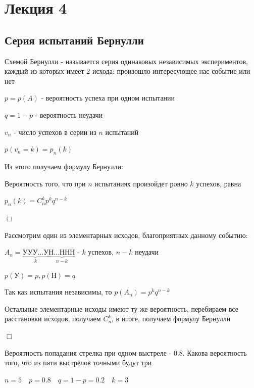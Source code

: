 \documentclass[12pt]{article}
\begin{document}

    \section{Лекция 4}

    \subsection{Серия испытаний Бернулли}

    Схемой Бернулли - называется серия одинаковых независимых экспериментов, каждый из которых имеет 2 исхода: произошло интересующее нас событие или нет

    $p = p(A)$ - вероятность успеха при одном испытании

    $q = 1 - p$ - вероятность неудачи

    $v_n$ - число успехов в серии из $n$ испытаний

    $p(v_n = k) = p_n(k)$

    Из этого получаем формулу Бернулли:

    \begin{MyTheorem}
        \Ths Вероятность того, что при $n$ испытаниях произойдет ровно $k$ успехов, равна

        $p_n(k) = C_n^k p^k q^{n - k}$
    \end{MyTheorem}

    \begin{MyProof}
        $\Box$

        Рассмотрим один из элементарных исходов, благоприятных данному событию:

        $A_n = \underset{k}{\underbrace{\text{УУУ}\dots\text{У}}}\underset{n - k}{\underbrace{\text{Н}\dots\text{ННН}}}$ - $k$ успехов, $n - k$ неудачи

        $p(\text{У}) = p, p(\text{Н}) = q$

        Так как испытания независимы, то $p(A_n) = p^k q^{n - k}$

        Остальные элементарные исходы имеют ту же вероятность, перебираем все расстановки исходов, получаем $C_n^k$, в итоге, получаем формулу Бернулли

        $\Box$
    \end{MyProof}

    \Ex Вероятность попадания стрелка при одном выстреле - $0.8$. Какова вероятность того, что из пяти выстрелов точными будут три

    $n = 5 \quad p = 0.8 \quad q = 1 - p = 0.2 \quad k = 3$
\end{document}
